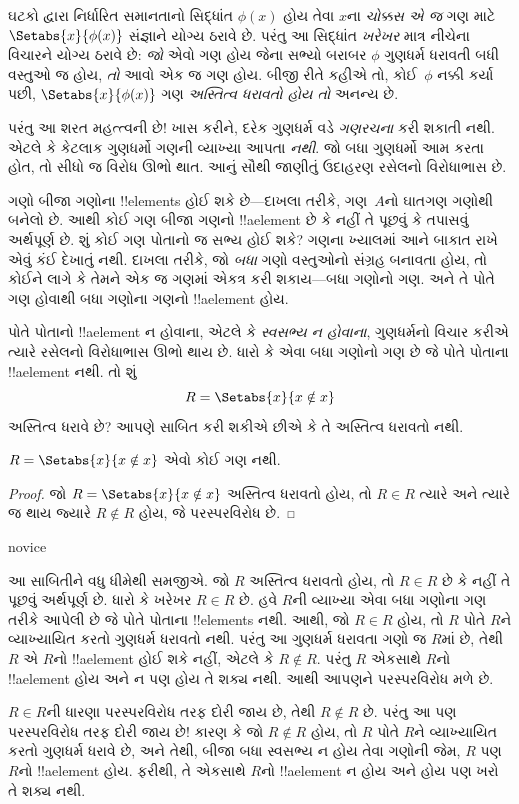 \documentclass[../../../include/open-logic-section]{subfiles}
\begin{document}

ઘટકો દ્વારા નિર્ધારિત સમાનતાનો સિદ્ધાંત $\phi(x)$ હોય તેવા $x$ના
\emph{ચોક્કસ એ જ} ગણ માટે $\Setabs{x}{\phi(x)}$ સંજ્ઞાને યોગ્ય ઠરાવે છે.
પરંતુ આ સિદ્ધાંત \emph{ખરેખર} માત્ર નીચેના વિચારને યોગ્ય ઠરાવે છે:
\emph{જો} એવો ગણ હોય જેના સભ્યો બરાબર $\phi$ ગુણધર્મ ધરાવતી બધી
વસ્તુઓ જ હોય, \emph{તો} આવો એક જ ગણ હોય.
બીજી રીતે કહીએ તો, કોઈ~$\phi$ નક્કી કર્યા પછી,
$\Setabs{x}{\phi(x)}$ ગણ \emph{અસ્તિત્વ ધરાવતો હોય તો} અનન્ય છે.

પરંતુ આ શરત મહત્ત્વની છે!{} ખાસ કરીને, દરેક ગુણધર્મ વડે
\emph{ગણરચના} કરી શકાતી નથી. એટલે કે કેટલાક ગુણધર્મો ગણની વ્યાખ્યા
આપતા \emph{નથી}. જો બધા ગુણધર્મો આમ કરતા હોત, તો સીધો જ
વિરોધ ઊભો થાત. આનું સૌથી જાણીતું ઉદાહરણ રસેલનો વિરોધાભાસ છે.

ગણો બીજા ગણોના !!{element}s હોઈ શકે છે---દાખલા તરીકે,
ગણ~$A$નો ઘાતગણ ગણોથી બનેલો છે.
આથી કોઈ ગણ બીજા ગણનો !!a{element} છે કે નહીં તે પૂછવું કે તપાસવું અર્થપૂર્ણ છે.
શું કોઈ ગણ પોતાનો જ સભ્ય હોઈ શકે?
ગણના ખ્યાલમાં આને બાકાત રાખે એવું કંઈ દેખાતું નથી.
દાખલા તરીકે, જો \emph{બધા} ગણો વસ્તુઓનો સંગ્રહ બનાવતા હોય,
તો કોઈને લાગે કે તેમને એક જ ગણમાં એકત્ર કરી શકાય---બધા ગણોનો ગણ.
અને તે પોતે ગણ હોવાથી બધા ગણોના ગણનો !!a{element} હોય.

પોતે પોતાનો !!a{element} ન હોવાના, એટલે કે \emph{સ્વસભ્ય ન હોવાના},
ગુણધર્મનો વિચાર કરીએ ત્યારે રસેલનો વિરોધાભાસ ઊભો થાય છે.
ધારો કે એવા બધા ગણોનો ગણ છે જે પોતે પોતાના !!a{element} નથી.
તો શું
\[
R = \Setabs{x}{x \notin x}
\]
અસ્તિત્વ ધરાવે છે? આપણે સાબિત કરી શકીએ છીએ કે તે અસ્તિત્વ ધરાવતો નથી.

\begin{thm}[રસેલનો વિરોધાભાસ]
	$R = \Setabs{x}{x \notin x}$ એવો કોઈ ગણ નથી.
\end{thm}

\begin{proof}
જો $R = \Setabs{x}{x \notin x}$ અસ્તિત્વ ધરાવતો હોય, તો
$R \in R$ ત્યારે અને ત્યારે જ થાય જ્યારે $R \notin R$ હોય,
જે પરસ્પરવિરોધ છે.
\end{proof}

\begin{tagblock}{novice}
\begin{explain}
આ સાબિતીને વધુ ધીમેથી સમજીએ. જો $R$ અસ્તિત્વ ધરાવતો હોય, તો
$R \in R$ છે કે નહીં તે પૂછવું અર્થપૂર્ણ છે.
ધારો કે ખરેખર $R \in R$ છે. હવે $R$ની વ્યાખ્યા એવા બધા ગણોના ગણ
તરીકે આપેલી છે જે પોતે પોતાના !!{element}s નથી.
આથી, જો $R \in R$ હોય, તો $R$ પોતે $R$ને વ્યાખ્યાયિત કરતો ગુણધર્મ ધરાવતો નથી.
પરંતુ આ ગુણધર્મ ધરાવતા ગણો જ $R$માં છે, તેથી $R$ એ $R$નો
!!a{element} હોઈ શકે નહીં, એટલે કે $R \notin R$.
પરંતુ $R$ એકસાથે $R$નો !!a{element} હોય અને ન પણ હોય તે શક્ય નથી.
આથી આપણને પરસ્પરવિરોધ મળે છે.

$R \in R$ની ધારણા પરસ્પરવિરોધ તરફ દોરી જાય છે, તેથી $R \notin R$ છે.
પરંતુ આ પણ પરસ્પરવિરોધ તરફ દોરી જાય છે!{}
કારણ કે જો $R \notin R$ હોય, તો $R$ પોતે $R$ને વ્યાખ્યાયિત કરતો ગુણધર્મ
ધરાવે છે, અને તેથી, બીજા બધા સ્વસભ્ય ન હોય તેવા ગણોની જેમ,
$R$ પણ $R$નો !!a{element} હોય.
ફરીથી, તે એકસાથે $R$નો !!a{element} ન હોય અને હોય પણ ખરો તે શક્ય નથી.
\end{explain}
\end{tagblock}
\end{document}

